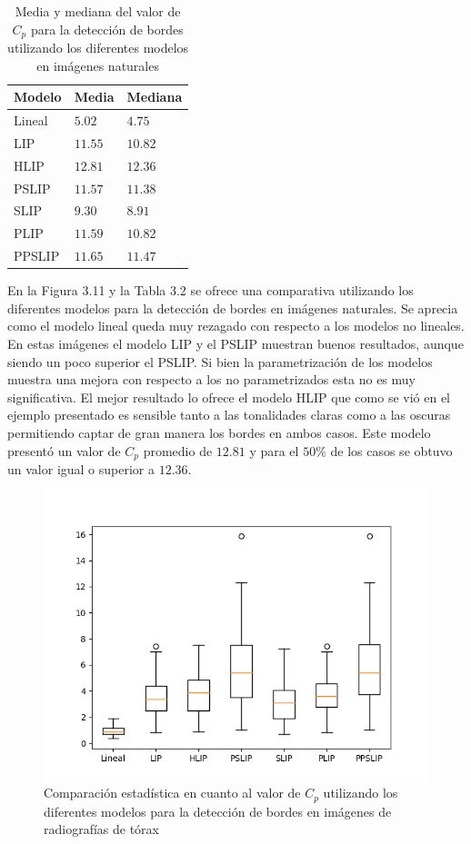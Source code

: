 \begin{table}
	\begin{center}
		\begin{tabular}{|l|l|l|}
			\hline 
			Modelo & Media & Mediana\\
			\hline
			Lineal & $5.02$ & $4.75$\\
			\hline
			LIP & $11.55$ & $10.82$\\
			\hline
			HLIP & $12.81$ & $12.36$\\
			\hline
			PSLIP & $11.57$ & $11.38$\\
			\hline
			SLIP & $9.30$ & $8.91$\\
			\hline
			PLIP & $11.59$ & $10.82$\\
			\hline
			PPSLIP & $11.65$ & $11.47$\\
			\hline
		\end{tabular}
		\caption{Media y mediana del valor de $C_p$ para la detecci\'on de bordes utilizando los diferentes modelos en im\'agenes naturales}
	\end{center}
\end{table}

En la Figura 3.11 y la Tabla 3.2 se ofrece una comparativa utilizando los diferentes modelos para la detecci\'on de bordes en im\'agenes naturales. Se aprecia como el modelo lineal queda muy rezagado con respecto a los modelos no lineales. En estas im\'agenes el modelo LIP y el PSLIP muestran buenos resultados, aunque siendo un poco superior el PSLIP. Si bien la parametrizaci\'on de los modelos muestra una mejora con respecto a los no parametrizados esta no es muy significativa. El mejor resultado lo ofrece el modelo HLIP que como se vi\'o en el ejemplo presentado es sensible tanto a las tonalidades claras como a las oscuras permitiendo captar de gran manera los bordes en ambos casos. Este modelo present\'o un valor de $C_p$ promedio de $12.81$ y para el $50\%$ de los casos se obtuvo un valor igual o superior a $12.36$. 

\begin{figure}
	\begin{center}
		\includegraphics[width=10.0 cm]{images/graphics/torax/ed/ed_all.png}
		\caption{Comparaci\'on estad\'istica en cuanto al valor de $C_p$ utilizando los diferentes modelos para la detecci\'on de bordes en im\'agenes de radiograf\'ias de t\'orax}
	\end{center}
\end{figure}

